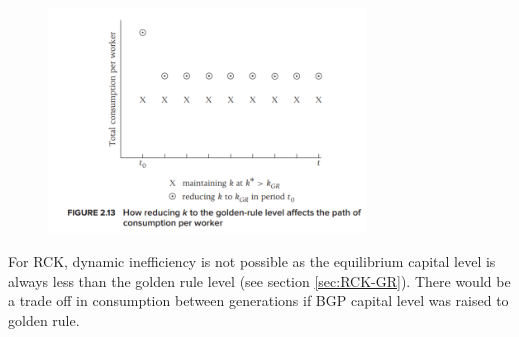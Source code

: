 \documentclass[../main.tex]{subfiles}
\begin{document}
        \begin{figure}[ht!]
            \centering \includegraphics[width=0.75\textwidth]{subfile/attachments/2.5-diamond-dynamic-inefficiency.png}
        \end{figure}
        
        For RCK, dynamic inefficiency is not possible as the equilibrium capital level is always less than the golden rule level (see section \ref{sec:RCK-GR}). There would be a trade off in consumption between generations if BGP capital level was raised to golden rule.
        
\end{document}
